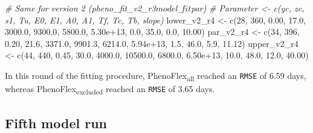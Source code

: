 \documentclass[
]{article}
\newenvironment{Shaded}{\begin{snugshade}}{\end{snugshade}}
\newcommand{\CommentTok}[1]{\textcolor[rgb]{0.56,0.35,0.01}{\textit{#1}}}
\newcommand{\DecValTok}[1]{\textcolor[rgb]{0.00,0.00,0.81}{#1}}
\newcommand{\FloatTok}[1]{\textcolor[rgb]{0.00,0.00,0.81}{#1}}
\newcommand{\FunctionTok}[1]{\textcolor[rgb]{0.00,0.00,0.00}{#1}}
\newcommand{\NormalTok}[1]{#1}
\newcommand{\OtherTok}[1]{\textcolor[rgb]{0.56,0.35,0.01}{#1}}
\begin{document}
\begin{Shaded}
\begin{Highlighting}[]
\CommentTok{\# Same for version 2 (pheno\_fit\_v2\_r3$model\_fit$par)}
\CommentTok{\# Parameter \textless{}{-} c(yc, zc,    s1,   Tu,     E0,      E1,     A0,       A1,   Tf,   Tc,   Tb, slope)}
\NormalTok{lower\_v2\_r4 }\OtherTok{\textless{}{-}} \FunctionTok{c}\NormalTok{(}\DecValTok{28}\NormalTok{, }\DecValTok{360}\NormalTok{, }\FloatTok{0.00}\NormalTok{, }\FloatTok{17.0}\NormalTok{, }\FloatTok{3000.0}\NormalTok{,  }\FloatTok{9300.0}\NormalTok{, }\FloatTok{5800.0}\NormalTok{, }\FloatTok{5.30e+13}\NormalTok{,  }\FloatTok{0.0}\NormalTok{, }\FloatTok{35.0}\NormalTok{,  }\FloatTok{0.0}\NormalTok{, }\FloatTok{10.00}\NormalTok{)}
\NormalTok{par\_v2\_r4   }\OtherTok{\textless{}{-}} \FunctionTok{c}\NormalTok{(}\DecValTok{34}\NormalTok{, }\DecValTok{396}\NormalTok{, }\FloatTok{0.20}\NormalTok{, }\FloatTok{21.6}\NormalTok{, }\FloatTok{3371.0}\NormalTok{,  }\FloatTok{9901.3}\NormalTok{, }\FloatTok{6214.0}\NormalTok{, }\FloatTok{5.94e+13}\NormalTok{,  }\FloatTok{1.5}\NormalTok{, }\FloatTok{46.0}\NormalTok{,  }\FloatTok{5.9}\NormalTok{, }\FloatTok{11.12}\NormalTok{)}
\NormalTok{upper\_v2\_r4 }\OtherTok{\textless{}{-}} \FunctionTok{c}\NormalTok{(}\DecValTok{44}\NormalTok{, }\DecValTok{440}\NormalTok{, }\FloatTok{0.45}\NormalTok{, }\FloatTok{30.0}\NormalTok{, }\FloatTok{4000.0}\NormalTok{, }\FloatTok{10500.0}\NormalTok{, }\FloatTok{6800.0}\NormalTok{, }\FloatTok{6.50e+13}\NormalTok{, }\FloatTok{10.0}\NormalTok{, }\FloatTok{48.0}\NormalTok{, }\FloatTok{12.0}\NormalTok{, }\FloatTok{40.00}\NormalTok{)}
\end{Highlighting}
\end{Shaded}

In this round of the fitting procedure, PhenoFlex\textsubscript{all}
reached an \texttt{RMSE} of 6.59 days, whereas
PhenoFlex\textsubscript{excluded} reached an \texttt{RMSE} of 3.65 days.

\hypertarget{fifth-model-run}{%
\subsection{Fifth model run}\label{fifth-model-run}}
\end{document}
